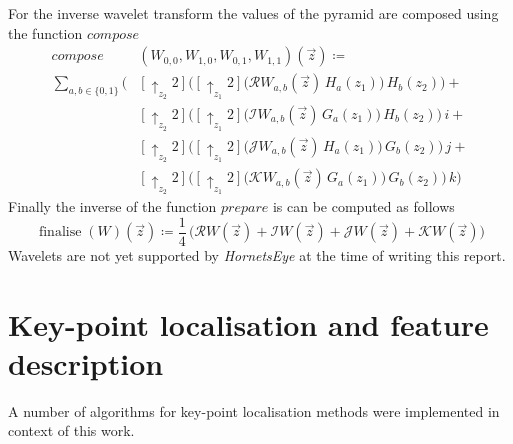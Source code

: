 \documentclass[a4paper,12pt]{book}
\begin{document}
For the inverse wavelet transform the values of the pyramid are composed
using the function $compose$
\begin{equation}
  \begin{split}
    compose&(W_{0,0},W_{1,0},W_{0,1},W_{1,1})(\vec{z})\coloneqq\\
    \sum_{a,b\in\{0,1\}}\bigg(&[\uparrow_{z_2}2]\Big([\uparrow_{z_1}2]\big(\mathcal{R}W_{a,b}(\vec{z})\,H_a(z_1)\big)\,H_b(z_2)\Big)+\\
    &[\uparrow_{z_2}2]\Big([\uparrow_{z_1}2]\big(\mathcal{I}W_{a,b}(\vec{z})\,G_a(z_1)\big)\,H_b(z_2)\Big)\,i+\\
    &[\uparrow_{z_2}2]\Big([\uparrow_{z_1}2]\big(\mathcal{J}W_{a,b}(\vec{z})\,H_a(z_1)\big)\,G_b(z_2)\Big)\,j+\\
    &[\uparrow_{z_2}2]\Big([\uparrow_{z_1}2]\big(\mathcal{K}W_{a,b}(\vec{z})\,G_a(z_1)\big)\,G_b(z_2)\Big)\,k\bigg)
  \end{split}
\end{equation}
Finally the inverse of the function $prepare$ is can be computed as follows
\begin{equation}
  \mathop{finalise}(W)(\vec{z})\coloneqq\frac{1}{4}\,\big(
  \mathcal{R}W(\vec{z})+\mathcal{I}W(\vec{z})+\mathcal{J}W(\vec{z})+
  \mathcal{K}W(\vec{z})\big)
\end{equation}
Wavelets are not yet supported by \emph{HornetsEye} at the time of writing
this report. %

\section{Key-point localisation and feature description}
A number of algorithms for key-point localisation methods were implemented
in context of this work.
\end{document}
